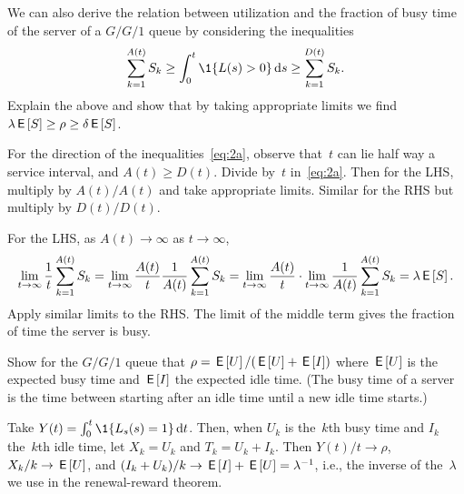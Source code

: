 \documentclass[stochastic-or.tex]{subfiles}
\begin{document}
\begin{exercise}\label{ex:70}
We can also derive the relation between utilization and the fraction of busy time of the server of a $G/G/1$ queue by considering the inequalities
\begin{equation}\label{eq:2a}
 \sum_{k=1}^{A(t)} S_k \geq \int_0^t \1{\L(s)>0} \d s \geq \sum_{k=1}^{D(t)} S_k.
\end{equation}
Explain the above and show that by taking appropriate limits we find $\lambda \,\mathsf{E}\left[S\right] \geq \rho \geq \delta \,\mathsf{E}\left[S\right]$.
\begin{hint}
For the direction of the inequalities~\cref{eq:2a}, observe that~$t$ can lie half way a service interval, and $A(t) \geq D(t)$.
Divide by~$t$ in~\cref{eq:2a}. Then for the LHS, multiply by $A(t)/A(t)$ and take appropriate limits. Similar for the RHS but multiply by $D(t)/D(t)$.
\end{hint}
\begin{solution}
  For the LHS, as $A(t)\to \infty$ as $t\to\infty$,
\begin{equation*}
 \lim_{t\to\infty} \frac 1 t\sum_{k=1}^{A(t)} S_k =
 \lim_{t\to\infty} \frac{A(t)}t \frac{1}{A(t)} \sum_{k=1}^{A(t)} S_k =
 \lim_{t\to\infty} \frac{A(t)}t \cdot \lim_{t\to\infty}\frac{1}{A(t)} \sum_{k=1}^{A(t)} S_k = \lambda \,\mathsf{E}\left[S\right].
\end{equation*}
Apply similar limits to the RHS.
The limit of the middle term gives the fraction of time the server is busy.
\end{solution}
\end{exercise}

\begin{exercise}\label{ex:57}
Show for the $G/G/1$ queue that $\rho = \,\mathsf{E}\left[U\right] / (\,\mathsf{E}\left[U\right] + \,\mathsf{E}\left[I\right])$ where $\,\mathsf{E}\left[U\right]$ is the expected busy time and $\,\mathsf{E}\left[I\right]$ the expected idle time.
(The busy time of a server is the time between starting after an idle time until a new idle time starts.)
\begin{solution}
Take $Y(t) = \int_0^t \1{\Ls(s)=1} \d t$. Then, when $U_{k}$ is the~$k$th busy time and $I_{k}$ the~$k$th idle time, let $X_{k} = U_{k}$ and $T_{k} = U_k + I_{k}$.
Then $Y(t)/ t\to\rho$, $X_k/k \to \,\mathsf{E}\left[U\right]$, and $(I_k + U_k)/k \to \,\mathsf{E}\left[I\right] + \,\mathsf{E}\left[U\right] = \lambda^{-1}$, i.e., the inverse of the~$\lambda$ we use in the renewal-reward theorem.
\end{solution}
\end{exercise}



\end{document}
